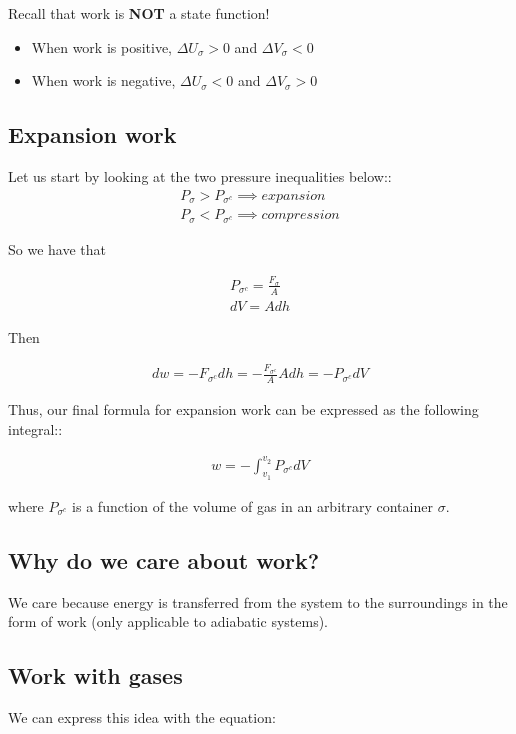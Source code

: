 \documentclass[12pt]{article}
\begin{document}
Recall that work is \textbf{NOT} a state function!
\begin{itemize}
    \item When work is positive, $\Delta U_\sigma>0$ and $\Delta V_\sigma<0$
    \item When work is negative, $\Delta U_\sigma<0$ and $\Delta V_\sigma>0$
\end{itemize}

\subsection*{Expansion work}
Let us start by looking at the two pressure inequalities below::
\begin{align*}
    P_\sigma > P_{\sigma^c} \implies expansion\\
    P_\sigma < P_{\sigma^c} \implies compression
\end{align*}

So we have that

\begin{align*}
    P_{\sigma^c} = \frac{F_{\sigma}}{A}\\
    dV = Adh
\end{align*}

Then

\begin{align*}
    dw = -F_{\sigma^c} dh = -\frac{F_{\sigma^c}}{A}Adh = -P_{\sigma^c}dV
\end{align*}
    
Thus, our final formula for expansion work can be expressed as the following integral::

\begin{align*}
    w=-\int_{v_1}^{v_2}P_{\sigma^c}dV
\end{align*}

where $P_{\sigma^c}$ is a function of the volume of gas in an arbitrary container $\sigma$.

\subsection*{Why do we care about work?}
We care because energy is transferred from the system to the surroundings in the form of work (only applicable to adiabatic systems).

\subsection*{Work with gases}
We can express this idea with the equation:
\end{document}
